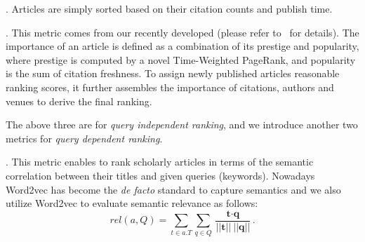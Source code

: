 




. Articles are simply sorted based on their citation counts and publish time. %


. This metric comes from our recently developed \sarank (please refer to~\cite{ma2018query} for details). The importance of an article is defined as a combination of its prestige and popularity, where prestige is computed by a novel Time-Weighted PageRank, and popularity is the sum of citation freshness. To assign newly published articles reasonable ranking scores, it further assembles the importance of citations, authors and venues to derive the final ranking. %

The above three are for {\em query independent ranking}, and we introduce another two metrics for {\em query dependent ranking}.

. This metric enables to rank scholarly articles in terms of the semantic correlation between their titles and given queries (keywords). Nowadays Word2vec \cite{corrado2013efficient} has become the {\em de facto} standard to capture semantics and we also utilize Word2vec to evaluate semantic relevance as follows:
%
%
\begin{equation}
\label{eq:relscore}
rel(a, Q) = \sum_{t \in a.T} \sum_{q \in Q} \frac {\textbf{t} \cdot \textbf{q}} {|| \textbf{t} ||\ ||\textbf{q}||}.
\end{equation}

